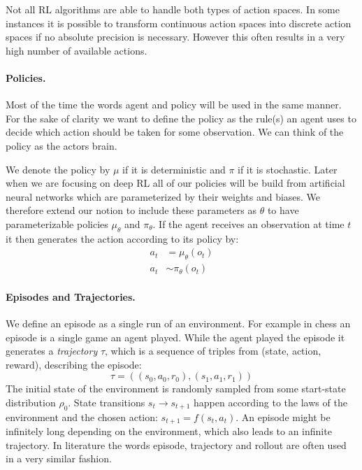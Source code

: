 Not all RL algorithms are able to handle both types of action spaces. In some instances it is possible to transform continuous action spaces into discrete action spaces if no absolute precision is necessary. However this often results in a very high number of available actions.

\paragraph{Policies.}
Most of the time the words agent and policy will be used in the same manner. For the sake of clarity we want to define the policy as the rule(s) an agent uses to decide which action should be taken for some observation. We can think of the policy as the actors brain.

We denote the policy by $\mu$ if it is deterministic and $\pi$ if it is stochastic. Later when we are focusing on deep RL all of our policies will be build from artificial neural networks which are parameterized by their weights and biases. We therefore extend our notion to include these parameters as $\theta$ to have parameterizable policies $\mu_\theta$ and $\pi_\theta$. If the agent receives an observation at time $t$ it then generates the action according to its policy by:
\begin{align*}
  a_t &= \mu_\theta(o_t) \\
  a_t &\sim \pi_\theta(o_t)
\end{align*}


\paragraph{Episodes and Trajectories.}
We define an episode as a single run of an environment. For example in chess an episode is a single game an agent played. While the agent played the episode it generates a \textit{trajectory} $\tau$, which is a sequence of triples from (state, action, reward), describing the episode:
\[\tau = ((s_0, a_0, r_0),  (s_1, a_1, r_1)) \]
The initial state of the environment is randomly sampled from some start-state distribution $\rho_0$. State transitions $s_t \rightarrow s_{t+1}$ happen according to the laws of the environment and the chosen action: $s_{t+1} = f(s_t, a_t)$. An episode might be infinitely long depending on the environment, which also leads to an infinite trajectory. In literature the words episode, trajectory and rollout are often used in a very similar fashion. 


